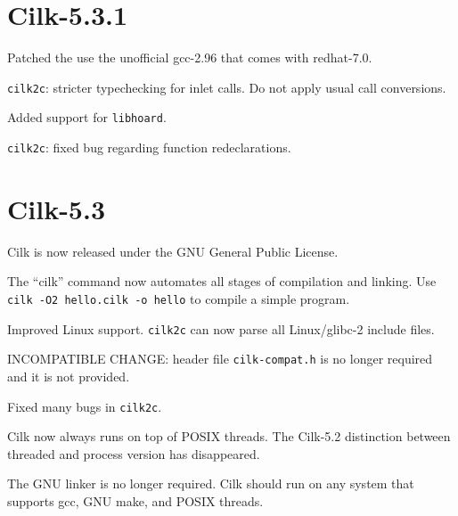 \section*{Cilk-5.3.1}

\begin{closeitemize}
\item Patched the use the unofficial gcc-2.96 that comes with
  redhat-7.0.
  
\item \texttt{cilk2c}: stricter typechecking for inlet calls.  Do not
  apply usual call conversions.

\item Added support for \texttt{libhoard}.

\item \texttt{cilk2c}: fixed bug regarding function redeclarations.

\end{closeitemize}

\section*{Cilk-5.3}

\begin{closeitemize}
  
\item Cilk is now released under the GNU General Public License.
  
\item The ``cilk'' command now automates all stages of compilation and
  linking.  Use \texttt{cilk -O2 hello.cilk -o hello} to compile a
  simple program.
  
\item Improved Linux support.  \texttt{cilk2c} can now parse all
  Linux/glibc-2 include files.

\item INCOMPATIBLE CHANGE: header file \texttt{cilk-compat.h}
  is no longer required and it is not provided.

\item Fixed many bugs in \texttt{cilk2c}.
  
\item Cilk now always runs on top of POSIX threads. The Cilk-5.2
  distinction between threaded and process version has disappeared.
  
\item The GNU linker is no longer required.  Cilk should run on any
  system that supports gcc, GNU make, and POSIX threads.

\end{closeitemize}

